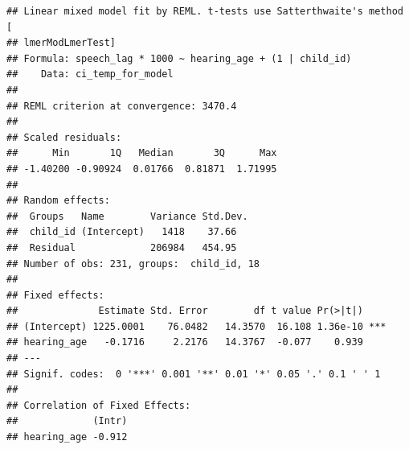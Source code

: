 \documentclass[
]{article}
\newenvironment{Shaded}{\begin{snugshade}}{\end{snugshade}}
\newcommand{\AttributeTok}[1]{\textcolor[rgb]{0.77,0.63,0.00}{#1}}
\newcommand{\CommentTok}[1]{\textcolor[rgb]{0.56,0.35,0.01}{\textit{#1}}}
\newcommand{\DecValTok}[1]{\textcolor[rgb]{0.00,0.00,0.81}{#1}}
\newcommand{\FunctionTok}[1]{\textcolor[rgb]{0.00,0.00,0.00}{#1}}
\newcommand{\NormalTok}[1]{#1}
\newcommand{\OtherTok}[1]{\textcolor[rgb]{0.56,0.35,0.01}{#1}}
\newcommand{\SpecialCharTok}[1]{\textcolor[rgb]{0.00,0.00,0.00}{#1}}
\newcommand{\StringTok}[1]{\textcolor[rgb]{0.31,0.60,0.02}{#1}}
\begin{document}
\begin{verbatim}
## Linear mixed model fit by REML. t-tests use Satterthwaite's method [
## lmerModLmerTest]
## Formula: speech_lag * 1000 ~ hearing_age + (1 | child_id)
##    Data: ci_temp_for_model
## 
## REML criterion at convergence: 3470.4
## 
## Scaled residuals: 
##      Min       1Q   Median       3Q      Max 
## -1.40200 -0.90924  0.01766  0.81871  1.71995 
## 
## Random effects:
##  Groups   Name        Variance Std.Dev.
##  child_id (Intercept)   1418    37.66  
##  Residual             206984   454.95  
## Number of obs: 231, groups:  child_id, 18
## 
## Fixed effects:
##              Estimate Std. Error        df t value Pr(>|t|)    
## (Intercept) 1225.0001    76.0482   14.3570  16.108 1.36e-10 ***
## hearing_age   -0.1716     2.2176   14.3767  -0.077    0.939    
## ---
## Signif. codes:  0 '***' 0.001 '**' 0.01 '*' 0.05 '.' 0.1 ' ' 1
## 
## Correlation of Fixed Effects:
##             (Intr)
## hearing_age -0.912
\end{verbatim}

\begin{Shaded}
\end{Shaded}
\end{document}
